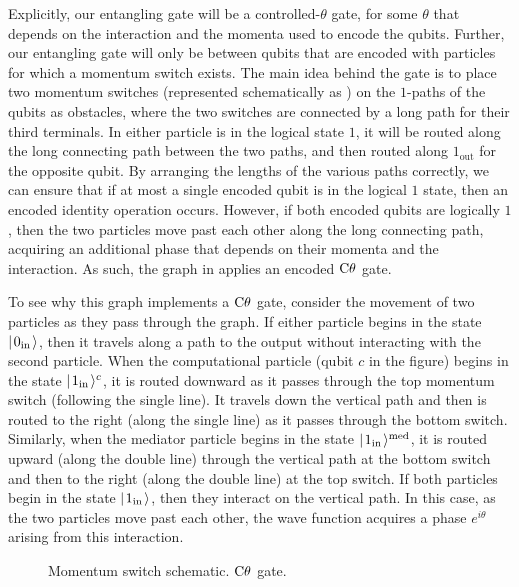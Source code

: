 \documentclass[../thesis-main/thesis-main]{subfiles}
\begin{document}
Explicitly, our entangling gate will be a controlled-$\theta$ gate, for some $\theta$ that depends on the interaction and the momenta used to encode the qubits.  Further, our entangling gate will only be between qubits that are encoded with particles for which a momentum switch  exists.  The main idea behind the gate is to place two momentum switches (represented schematically as ) on the $1$-paths of the qubits as obstacles, where the two switches are connected by a long path for their third terminals.  In either particle is in the logical state $1$, it will be routed along the long connecting path between the two paths, and then routed along $1_{\text{out}}$ for the opposite qubit.  By arranging the lengths of the various paths correctly, we can ensure that if at most a single encoded qubit is in the logical $1$ state, then an encoded identity operation occurs.  However, if both encoded qubits are logically $1$, then the two particles move past each other along the long connecting path, acquiring an additional phase that depends on their momenta and the interaction.  As such, the graph in  applies an encoded $\mathrm{C}\theta$ gate.

To see why this graph implements a $\mathrm{C}\theta$ gate, consider the movement of two particles as they pass through the graph. If either particle begins in the state $|\mspace{2mu} 0_{\text{in}} \mspace{2mu} \rangle$, then it travels along a path to the output without interacting with the second particle. When the computational particle (qubit $c$ in the figure) begins in the state $|\mspace{2mu} 1_{\text{in}} \mspace{2mu} \rangle^c$, it is routed downward as it passes through the top momentum switch (following the single line). It travels down the vertical path and then is routed to the right (along the single line) as it passes through the bottom switch.  Similarly, when the mediator particle begins in the state $|\mspace{2mu} 1_{\text{in}} \mspace{2mu} \rangle^{\text{med}}$, it is routed upward (along the double line) through the vertical path at the bottom switch and then to the right (along the double line) at the top switch. If both particles begin in the state $|\mspace{2mu} 1_{\text{in}} \mspace{2mu} \rangle$, then they interact on the vertical path. In this case, as the two particles move past each other, the wave function acquires a phase $e^{i\theta}$ arising from this interaction. 


\begin{figure}
\centering
{}
\hspace{0.5cm}
\caption{ Momentum switch schematic.  $\mathrm{C}\theta$ gate.}

\label{fig:onepsplit}
\end{figure}
\end{document}
